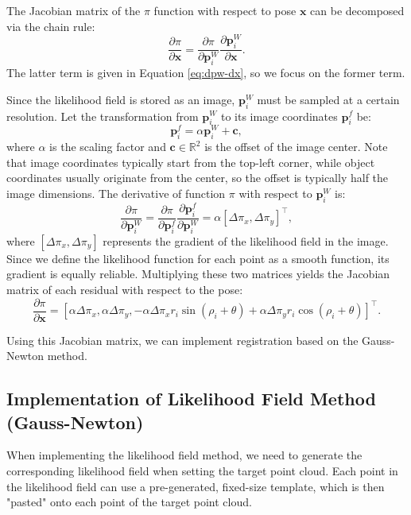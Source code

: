 The Jacobian matrix of the $\pi$ function with respect to pose $\bm{x}$ can be decomposed via the chain rule:
\begin{equation}\label{key}
	\frac{\partial \pi}{\partial \bm{x}} = \frac{\partial \pi}{\partial \bm{p}^W_i} \frac{\partial \bm{p}^W_i}{\partial \bm{x}}.
\end{equation}
The latter term is given in Equation \eqref{eq:dpw-dx}, so we focus on the former term.

Since the likelihood field is stored as an image, $\bm{p}^W_i$ must be sampled at a certain resolution. Let the transformation from $\bm{p}^W_i$ to its image coordinates $\bm{p}^f_i$ be:
\begin{equation}\label{key}
	\bm{p}^f_i = \alpha \bm{p}^W_i + \bm{c},
\end{equation}
where $\alpha$ is the scaling factor and $\bm{c} \in \mathbb{R}^2$ is the offset of the image center. Note that image coordinates typically start from the top-left corner, while object coordinates usually originate from the center, so the offset is typically half the image dimensions. The derivative of function $\pi$ with respect to $\bm{p}^W_i$ is:
\begin{equation}\label{key}
	\frac{\partial \pi}{\partial \bm{p}^W_i} = \frac{\partial \pi}{\partial \bm{p}^f_i} \frac{\partial \bm{p}^f_i}{\partial \bm{p}^W_i}= \alpha [\Delta \pi_x, \Delta \pi_y]^\top,
\end{equation}
where $[\Delta \pi_x, \Delta \pi_y]$ represents the gradient of the likelihood field in the image. Since we define the likelihood function for each point as a smooth function, its gradient is equally reliable. Multiplying these two matrices yields the Jacobian matrix of each residual with respect to the pose:
\begin{equation}\label{key}
	\frac{\partial \pi}{\partial \bm{x}} = [\alpha \Delta \pi_x, \alpha \Delta \pi_y, -\alpha \Delta \pi_x r_i \sin(\rho_i+\theta) + \alpha \Delta \pi_y r_i \cos(\rho_i +\theta)]^\top.
\end{equation}

Using this Jacobian matrix, we can implement registration based on the Gauss-Newton method.

\subsection{Implementation of Likelihood Field Method (Gauss-Newton)}  

When implementing the likelihood field method, we need to generate the corresponding likelihood field when setting the target point cloud. Each point in the likelihood field can use a pre-generated, fixed-size template, which is then "pasted" onto each point of the target point cloud.  


